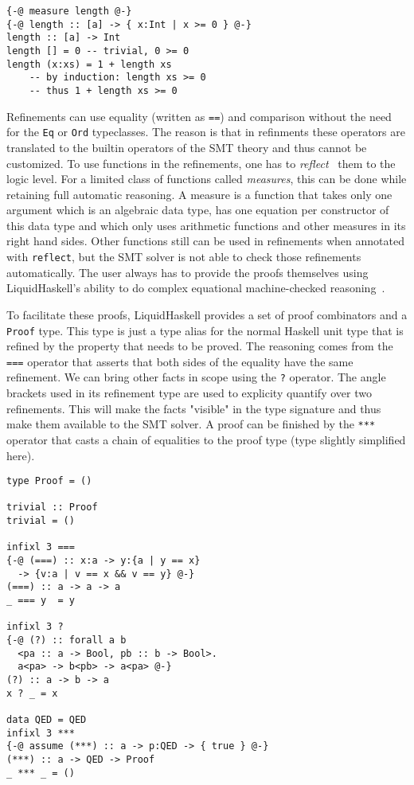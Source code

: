 \documentclass[sigplan,screen]{acmart}
\begin{document}
\begin{lstlisting}
{-@ measure length @-}
{-@ length :: [a] -> { x:Int | x >= 0 } @-}
length :: [a] -> Int
length [] = 0 -- trivial, 0 >= 0
length (x:xs) = 1 + length xs
    -- by induction: length xs >= 0
    -- thus 1 + length xs >= 0
\end{lstlisting}

Refinements can use equality (written as \texttt{==}) and comparison without the need for the \texttt{Eq} or \texttt{Ord} typeclasses. The reason is that in refinments these operators are translated to the builtin operators of the SMT theory and thus cannot be customized. To use functions in the refinements, one has to \textit{reflect}~\cite{reflection} them to the logic level. For a limited class of functions called \textit{measures}, this can be done while retaining full automatic reasoning. A measure is a function that takes only one argument which is an algebraic data type, has one equation per constructor of this data type and which only uses arithmetic functions and other measures in its right hand sides. Other functions still can be used in refinements when annotated with \texttt{reflect}, but the SMT solver is not able to check those refinements automatically. The user always has to provide the proofs themselves using LiquidHaskell's ability to do complex equational machine-checked reasoning~\cite{tpfa}.

To facilitate these proofs, LiquidHaskell provides a set of proof combinators and a \texttt{Proof} type. This type is just a type alias for the normal Haskell unit type that is refined by the property that needs to be proved. The reasoning comes from the \texttt{===} operator that asserts that both sides of the equality have the same refinement. We can bring other facts in scope using the \texttt{?} operator. The angle brackets used in its refinement type are used to explicity quantify over two refinements. This will make the facts "visible" in the type signature and thus make them available to the SMT solver. A proof can be finished by the \texttt{***} operator that casts a chain of equalities to the proof type (type slightly simplified here).

\begin{lstlisting}
type Proof = ()

trivial :: Proof
trivial = ()

infixl 3 ===
{-@ (===) :: x:a -> y:{a | y == x}
  -> {v:a | v == x && v == y} @-}
(===) :: a -> a -> a
_ === y  = y

infixl 3 ?
{-@ (?) :: forall a b
  <pa :: a -> Bool, pb :: b -> Bool>.
  a<pa> -> b<pb> -> a<pa> @-}
(?) :: a -> b -> a
x ? _ = x

data QED = QED
infixl 3 ***
{-@ assume (***) :: a -> p:QED -> { true } @-}
(***) :: a -> QED -> Proof
_ *** _ = ()
\end{lstlisting}
\end{document}
